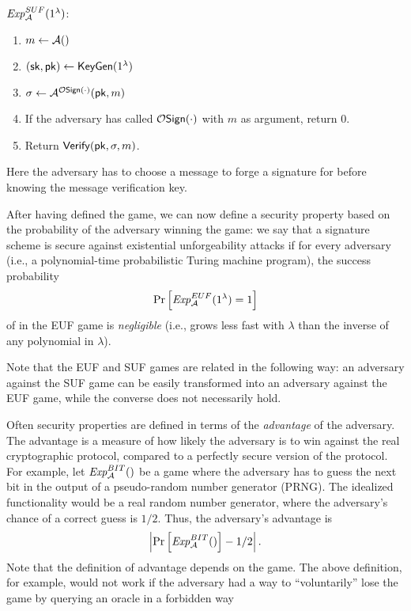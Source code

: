 \bigskip
\noindent $\mathit{Exp}_{\mathcal{A}}^{SUF}(1^\lambda)$:
\vspace{-0.5\topsep}
\begin{enumerate}
  \setlength\itemsep{0em}
  \item $m \leftarrow \mathcal{A}()$
  \item $(\mathsf{sk}, \mathsf{pk}) \leftarrow \mathsf{KeyGen}(1^\lambda)$
  \item $\sigma \leftarrow \mathcal{A}^{\mathcal{O}\mathsf{Sign(\cdot)}}(\mathsf{pk}, m)$
  \item If the adversary has called $\mathcal{O}\mathsf{Sign}(\cdot)$ with $m$ as argument,
    return $0$.
  \item Return $\mathsf{Verify}(\mathsf{pk}, \sigma, m)$.
\end{enumerate}
Here the adversary has to choose a message to forge a signature for before
knowing the message verification key.

After having defined the game, we can now define a security property based on
the probability of the adversary winning the game: we say that a signature
scheme is secure against existential unforgeability attacks if for every
adversary~ (i.e., a polynomial-time probabilistic Turing machine
program), the success probability
\begin{equation*}
  \Pr\left [\mathit{Exp}_{\mathcal{A}}^{EUF}(1^\lambda) = 1  \right ]
\end{equation*}
of  in the EUF game is \emph{negligible} (i.e., grows less fast with
$\lambda$ than the inverse of any polynomial in $\lambda$).

Note that the EUF and SUF games are related in the following way:  an adversary
against the SUF game can be easily transformed into an adversary against the
EUF game, while the converse does not necessarily hold.

Often security properties are defined in terms of the \emph{advantage} of the
adversary.  The advantage is a measure of how likely the adversary is to win
against the real cryptographic protocol, compared to a perfectly secure version
of the protocol.  For example, let $\mathit{Exp}_{\mathcal{A}}^{BIT}()$ be a game
where the adversary has to guess the next bit in the output of a pseudo-random number
generator (PRNG).  The idealized functionality would be a real random number generator,
where the adversary's chance of a correct guess is $1/2$.  Thus, the adversary's advantage is
\begin{equation*}
  \left|\Pr\left [\mathit{Exp}_{\mathcal{A}}^{BIT}() \right ] - 1/2\right|.
\end{equation*}
Note that the definition of advantage depends on the game.  The above
definition, for example, would not work if the adversary had a way to
``voluntarily'' lose the game by querying an oracle in a forbidden way



